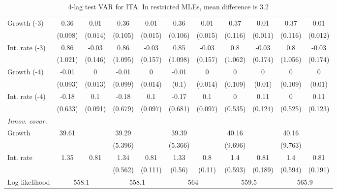 \begin{table}[htbp]
\begin{tabular}{@{\extracolsep{4pt}}lcccccccccc@{}}
\quad Growth (-3) 	 &0.36 	 & 0.01 	 & 0.36 	 & 0.01 	 & 0.36 	 & 0.01 	 & 0.37 	 & 0.01 	 & 0.37 	 & 0.01	 \\ 
 		 & (0.098) 	 & (0.014) 	 & (0.105) 	 & (0.015) 	 & (0.106) 	 & (0.015) 	 & (0.116) 	 & (0.011) 	 & (0.116) 	 & (0.012) 	 \\ 
\quad Int. rate (-3) 	 &0.86 	 & -0.03 	 & 0.86 	 & -0.03 	 & 0.85 	 & -0.03 	 & 0.8 	 & -0.03 	 & 0.8 	 & -0.03	 \\ 
 		 & (1.021) 	 & (0.146) 	 & (1.095) 	 & (0.157) 	 & (1.098) 	 & (0.157) 	 & (1.062) 	 & (0.174) 	 & (1.056) 	 & (0.174) 	 \\ 
\quad Growth (-4) 	 &-0.01 	 & 0 	 & -0.01 	 & 0 	 & -0.01 	 & 0 	 & 0 	 & 0 	 & 0 	 & 0	 \\ 
 		 & (0.093) 	 & (0.013) 	 & (0.099) 	 & (0.014) 	 & (0.1) 	 & (0.014) 	 & (0.109) 	 & (0.01) 	 & (0.109) 	 & (0.01) 	 \\ 
\quad Int. rate (-4) 	 &-0.18 	 & 0.1 	 & -0.18 	 & 0.1 	 & -0.17 	 & 0.1 	 & 0 	 & 0.11 	 & 0 	 & 0.11	 \\ 
 		 & (0.633) 	 & (0.091) 	 & (0.679) 	 & (0.097) 	 & (0.681) 	 & (0.097) 	 & (0.535) 	 & (0.124) 	 & (0.525) 	 & (0.123) 	 \\ 
\rule{0pt}{4ex} \emph{Innov. covar.}  	 & 	 & 	 & 	 & 	 & 	 & 	 & 	 & 	 & 	 &\\ 
\quad Growth 	 &39.61 	 &  	 & 39.29 	 &  	 & 39.39 	 &  	 & 40.16 	 &  	 & 40.16 	 & 	 \\ 
 		 &  	 &  	 & (5.396) 	 &  	 & (5.366) 	 &  	 & (9.696) 	 &  	 & (9.763) 	 &  	 \\ 
\quad Int. rate 	 &1.35 	 & 0.81 	 & 1.34 	 & 0.81 	 & 1.33 	 & 0.8 	 & 1.4 	 & 0.81 	 & 1.4 	 & 0.81	 \\ 
 		 &  	 &  	 & (0.562) 	 & (0.111) 	 & (0.56) 	 & (0.11) 	 & (0.593) 	 & (0.189) 	 & (0.594) 	 & (0.191) 	 \\ 
 \hline \rule{0pt}{4ex} 
  Log likelihood 	 &\multicolumn{2}{c}{558.1} 	 & \multicolumn{2}{c}{558.1} 	 & \multicolumn{2}{c}{564} 	 & \multicolumn{2}{c}{559.5} 	 & \multicolumn{2}{c}{565.9}\\ 

 \hline 	\end{tabular}		\caption{4-lag test VAR for ITA. In restricted MLEs, mean difference is 3.2}
		\label{tab:ITA4}

\end{table}
